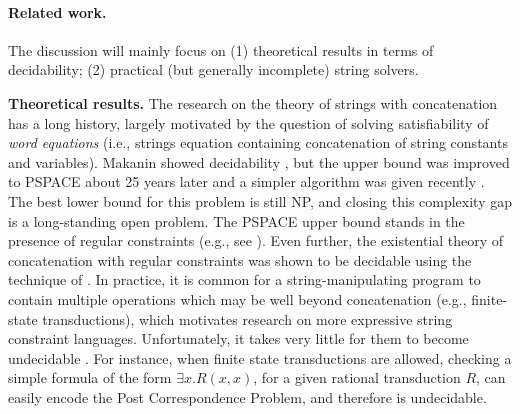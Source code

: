 
%
%
%
%
%
 

\paragraph*{Related work.}
The discussion will mainly focus on (1) theoretical results in terms of decidability; %
(2) practical (but generally incomplete) string solvers.  %

\smallskip 
\noindent\textbf{Theoretical results.}
The research on the theory of strings with concatenation has a long history, largely motivated by %
the question of solving satisfiability of \emph{word equations} (i.e., strings equation containing concatenation of string constants and variables). Makanin showed decidability \cite{Makanin}, but the upper bound was improved to PSPACE about 25 years later \cite{P04} and  %
a simpler algorithm was given recently \cite{J17}. %
The best lower bound for this problem is still NP, and closing this complexity gap is a long-standing open problem. %
%
The PSPACE upper bound stands %
in the presence of regular constraints (e.g., see \cite{Schulz}). Even further, the existential theory
of concatenation with regular constraints was shown to be decidable using the technique of \cite{buchi}.
%
In practice, it is common for a string-manipulating program to contain multiple operations which may be well beyond concatenation
(e.g., finite-state transductions), which motivates research on more expressive string constraint languages.   %
Unfortunately, it takes very little for %
them to become undecidable \cite{LB16}. For instance, when finite state transductions are allowed, checking a simple formula of the form $\exists x.R(x, x)$, for a given rational transduction $R$, can easily encode the Post Correspondence Problem, and therefore is undecidable.
%
%

